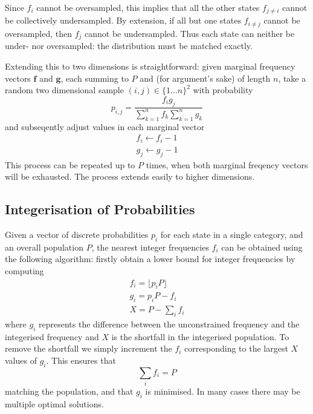 \documentclass{JASSS}
\begin{document}
Since \(f_i\) cannot be oversampled, this implies that all the other
states \(f_{j\neq{i}}\) cannot be collectively undersampled. By extension, if all but
one states \(f_{i\neq{j}}\) cannot be oversampled, then \(f_j\) cannot
be undersampled. Thus each state can neither be under- nor oversampled:
the distribution must be matched exactly.

Extending this to two dimensions is straightforward: given marginal frequency vectors \(\mathbf{f}\) and \(\mathbf{g}\), each summing to \(P\) and (for argument's sake) of length \(n\), take a random two dimensional sample \((i,j) \in \{1...n\}^2\) with probability
\begin{equation}
p_{i,j} = \frac{f_{i}g_{j}}{\sum\limits_{k=1}^{n}f_k\sum\limits_{k=1}^{n}g_k}
\end{equation}
and subseqently adjust values in each marginal vector
\begin{equation}
\begin{split}
f_i \leftarrow f_i-1 \\
g_j \leftarrow g_j-1 
\end{split}
\end{equation} 
This process can be repeated up to \(P\) times, when both marginal freqency vectors will be exhausted. The process extends easily to higher dimensions.

\subsection{Integerisation of Probabilities}\label{integerisation-of-probabilities}

Given a vector of discrete probabilities \(p_i\) for each state in a single category, and an overall population \(P\), the nearest integer frequencies \(f_i\) can be obtained using the following algorithm:
firstly obtain a lower bound for integer frequencies by computing
\begin{equation}
\begin{split}
f_i = \lfloor p_{i}P \rfloor \\
g_i = p_i P - f_i \\
X = P - \sum\limits_i{f_i}
\end{split}
\end{equation}
where \(g_i\) represents the difference between the unconstrained frequency and the integerised frequency and \(X\) is the shortfall in the integerised population. To remove the shortfall we simply increment the \(f_i\) corresponding to the largest \(X\) values of \(g_i\). This ensures that
\begin{equation}
\sum\limits_i{f_i} = P 
\end{equation}
matching the population, and that \(g_i\) is minimised. In many cases there may be multiple optimal solutions. 
\end{document}
